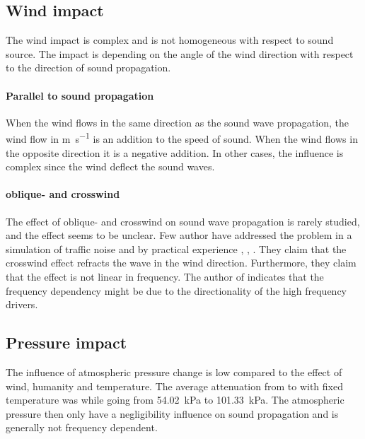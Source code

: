\subsection{Wind impact}
The wind impact is complex and is not homogeneous with respect to sound source. The impact is depending on the angle of the wind direction with respect to the direction of sound propagation. 


\paragraph{Parallel to sound propagation} When the wind flows in the same direction as the sound wave propagation, the wind flow in \si{\meter\per\second} is an addition to the speed of sound. When the wind flows in the opposite direction it is a negative addition.  In other cases, the influence is complex since the wind deflect the sound waves.

\paragraph{oblique- and crosswind} The effect of oblique- and crosswind on sound wave propagation is rarely studied, and the effect seems to be unclear. Few author have addressed the problem in a simulation of traffic noise and by practical experience \citep{effect_of_wind}, \citep{crosswind_effect_2016}, \citep{BALLOU2008xi}. They claim that the crosswind effect refracts the wave in the wind direction. Furthermore, they claim that the effect is not linear in frequency. The author of \citep{BALLOU2008xi} indicates that the frequency dependency might be due to the directionality of the high frequency drivers. 



\subsection{Pressure impact}
The influence of atmospheric pressure change is low compared to the effect of wind, humanity and temperature. The average attenuation from  to  with fixed temperature was  while going from \SI{54.02}{\kilo\pascal} to \SI{101.33}{\kilo\pascal}. The atmospheric pressure then only have a negligibility influence on sound propagation and is generally not frequency dependent. 
 
 
